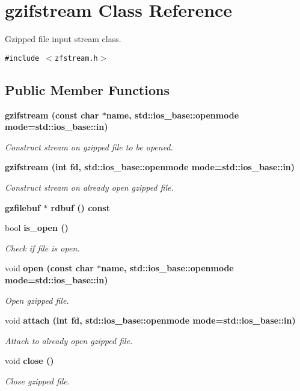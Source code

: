 \section{gzifstream Class Reference}
\label{classgzifstream}
Gzipped file input stream class.  


{\tt \#include $<$zfstream.h$>$}

\subsection*{Public Member Functions}
\begin{CompactItemize}
\item 
\bf{gzifstream} (const char $\ast$name, std::ios\_\-base::openmode mode=std::ios\_\-base::in)
\begin{CompactList}\small\item\em Construct stream on gzipped file to be opened. \item\end{CompactList}\item 
\bf{gzifstream} (int fd, std::ios\_\-base::openmode mode=std::ios\_\-base::in)
\begin{CompactList}\small\item\em Construct stream on already open gzipped file. \item\end{CompactList}\item 
\bf{gzfilebuf} $\ast$ \bf{rdbuf} () const 
\item 
bool \bf{is\_\-open} ()
\begin{CompactList}\small\item\em Check if file is open. \item\end{CompactList}\item 
void \bf{open} (const char $\ast$name, std::ios\_\-base::openmode mode=std::ios\_\-base::in)
\begin{CompactList}\small\item\em Open gzipped file. \item\end{CompactList}\item 
void \bf{attach} (int fd, std::ios\_\-base::openmode mode=std::ios\_\-base::in)
\begin{CompactList}\small\item\em Attach to already open gzipped file. \item\end{CompactList}\item 
void \bf{close} ()
\begin{CompactList}\small\item\em Close gzipped file. \item\end{CompactList}\end{CompactItemize}


